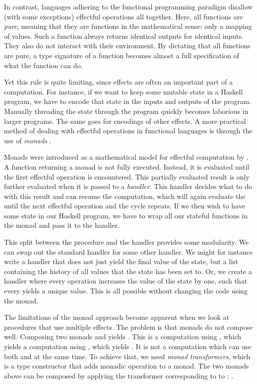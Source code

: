 In contrast, languages adhering to the functional programming paradigm disallow (with some exceptions) effectful operations all together. Here, all functions are \emph{pure}, meaning that they are functions in the mathematical sense: only a mapping of values. Such a function always returns identical outputs for identical inputs. They also do not interact with their environment. By dictating that all functions are pure, a type signature of a function becomes almost a full specification of what the function can do.

Yet this rule is quite limiting, since effects are often an important part of a computation. For instance, if we want to keep some mutable state  in a Haskell program, we have to encode that state in the inputs and outputs of the program. Manually threading the state through the program quickly becomes laborious in larger programs. The same goes for encodings of other effects. A more practical method of dealing with effectful operations in functional languages is through the use of \emph{monads} \autocite{wadler_essence_1992,peyton_jones_imperative_1993}.

Monads were introduced as a mathematical model for effectful computation by \textcite{moggi_notions_1991}. A function returning a monad is not fully executed. Instead, it is evaluated until the first effectful operation is encountered. This partially evaluated result is only further evaluated when it is passed to a \emph{handler}. This handler decides what to do with this result and can resume the computation, which will again evaluate the until the next effectful operation and the cycle repeats. If we then wish to have some state in our Haskell program, we have to wrap all our stateful functions in the  monad and pass it to the  handler.

This split between the procedure and the handler provides some modularity. We can swap out the standard  handler for some other handler. We might for instance write a handler that does not just yield the final value of the state, but a list containing the history of all values that the state has been set to. Or, we create a handler where every  operation increases the value of the state by one, such that every  yields a unique value. This is all possible without changing the code using the  monad.

The limitations of the monad approach become apparent when we look at procedures that use multiple effects. The problem is that monads do not compose well. Composing two monads  and  yields . This is a computation using , which yields a computation using , which yields . It is not a computation which can use both  and  at the same time. To achieve that, we need \emph{monad transformers}, which is a type constructor that adds monadic operation to a monad. The two monads above can be composed by applying the transformer  corresponding to  to : . 

